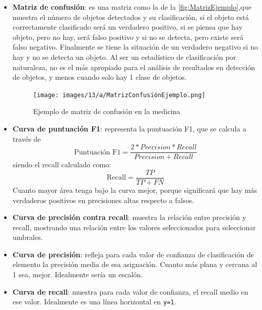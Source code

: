 \begin{itemize}
    \item \textbf{Matriz de confusión}: es una matriz como la de la \autoref{fig:MatrizEjemplo},que muestra el número de objetos detectados y su clasificación, si el objeto está correctamente clasificado será un verdadero positivo, si 
    se piensa que hay objeto, pero no hay, será falso positivo y si no se detecta, pero existe será falso negativo. Finalmente se tiene la situación de un verdadero negativo si no hay y no se detecta un objeto. Al ser un 
    estadístico de clasificación por naturaleza, no es el más apropiado para el análisis de resultados en detección de objetos, y menos cuando solo hay 1 clase de objetos.

    \begin{figure}[H]
        \centering
        \texttt{[image: images/13/a/MatrizConfusiónEjemplo.png]}
        \caption{Ejemplo de matriz de confusión en la medicina}
        \label{fig:MatrizEjemplo}
    \end{figure}

    \item \textbf{Curva de puntuación F1}: representa la puntuación F1, que se calcula a través de \begin{equation*}\text{Puntuación F1} = \frac{2*Precision*Recall}{Precision+Recall}\end{equation*} siendo el recall 
    calculado como: \begin{equation*}\text{Recall} = \frac{TP}{TP+FN}\end{equation*} Cuanto mayor área tenga bajo la curva mejor, porque significará que hay más verdaderos positivos en precisiones altas respecto a falsos.
    \item \textbf{Curva de precisión contra recall}: muestra la relación entre precisión y recall, mostrando una relación entre los valores seleccionados para seleccionar umbrales.
    \item \textbf{Curva de precisión}: refleja para cada valor de confianza de clasificación de elemento la precisión media de esa asignación. Cuanto más plana y cercana al 1 sea, mejor. Idealmente sería un escalón.
    \item \textbf{Curva de recall}: muestra para cada valor de confianza, el recall medio en ese valor. Idealmente es una línea horizontal en \texttt{y=1}.
\end{itemize}
